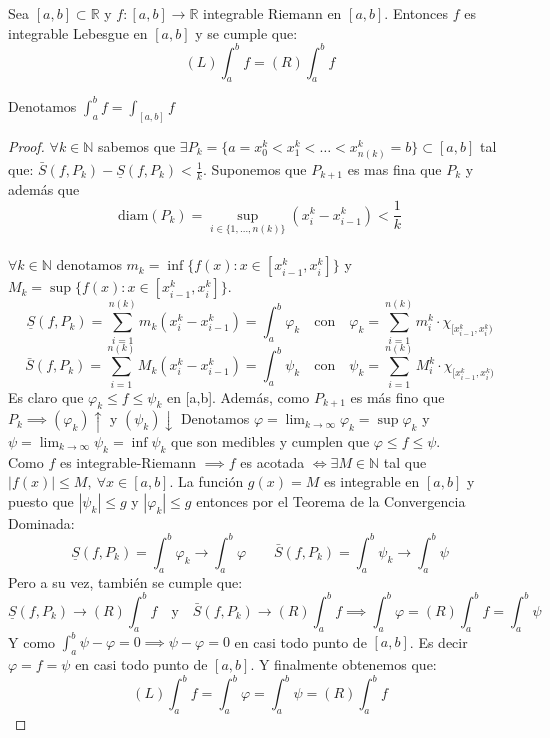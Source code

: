 \begin{teorema}
    Sea $[a, b] \subset \mathbb{R}$ y $ f:[a,b] \to \mathbb{R}$ integrable Riemann en $[a, b]$. Entonces $f$ es integrable Lebesgue en $[a, b]$ y se cumple que:
    $$ (L) \int_{a}^{b}f = (R) \int_{a}^{b}f $$
\end{teorema}
\begin{observación}
Denotamos $\int_{a}^{b}f = \int_{[a, b]}f$
\end{observación}
\begin{proof}
    $\forall k \in \mathbb{N}$ sabemos que $\exists P_k = \{ a = x_0^k < x_1^k < \dots < x_{n(k)}^k = b \} \subset [a,b]$ tal que: $\bar{S}(f, P_k) - \underline{S}(f, P_k) < \frac{1}{k}$.
    Suponemos que $P_{k+1}$ es mas fina que $P_{k}$ y además que $$\text{diam}(P_k) = \sup_{i \in \{1, \dots, n(k)\}}(x_i^k - x_{i-1}^k) < \frac{1}{k}$$
    \\$\forall k \in \mathbb{N}$ denotamos $m_k = \inf\{f(x) : x \in [x_{i-1}^k, x_i^k]\}$ y $M_k = \sup\{f(x) : x \in [x_{i-1}^k, x_i^k]\}$.
    $$ \underline{S}(f, P_k) = \sum_{i=1}^{n(k)}m_k(x_i^k - x_{i-1}^k) = \int_{a}^{b}\varphi_k \quad \text{con} \quad \varphi_k = \sum_{i = 1}^{n(k)}m_i^k\cdot\chi_{[x_{i-1}^k, x_i^k)}$$
    $$\bar{S}(f, P_k) = \sum_{i=1}^{n(k)}M_k(x_i^k - x_{i-1}^k) = \int_{a}^{b} \psi_k \quad \text{con}  \quad \psi_k  = \sum_{i = 1}^{n(k)}M_i^k\cdot\chi_{[x_{i-1}^k, x_i^k)}$$
    Es claro que $\varphi_k  \leq f \leq \psi_k$ en [a,b].
    Además, como $P_{k+1}$ es más fino que $P_k \implies (\varphi_{k})\uparrow$ y $(\psi_k)\downarrow$
    Denotamos $\varphi = \lim_{k \to \infty}\varphi_k = \sup\varphi_k$
    y $\psi  = \lim_{k \to \infty}\psi_k = \inf\psi_k$ que son medibles y cumplen que $\varphi \leq f \leq \psi$.\\
    Como $f$ es integrable-Riemann $\implies f$ es acotada $\iff \exists M \in \mathbb{N}$ tal que $|f(x)| \leq M, \ \forall x \in [a, b]$.
    La función  $ g(x) = M $ es integrable en $[a, b]$ y puesto que $|\psi_k| \leq g$ y $|\varphi_k| \leq g$ entonces por el Teorema de la Convergencia Dominada: $$\underline{S}(f, P_{k}) = \int_{a}^{b}{\varphi_k} \to \int_{a}^{b}\varphi \qquad \bar{S}(f, P_{k}) = \int_a^b\psi_k \to \int_a^b\psi$$
    Pero a su vez, también se cumple que: \\ $$\underline{S}(f, P_k) \to (R)\int_a^b f \quad \text{y} \quad \bar{S}(f, P_k) \to (R)\int_{a}^{b} f \implies \int_{a}^{b} \varphi = (R)\int_{a}^{b} f = \int_{a}^{b} \psi$$
    Y como $\int_{a}^{b} \psi - \varphi = 0 \implies \psi - \varphi = 0$ en casi todo punto de $[a, b]$. Es decir $\varphi = f = \psi$ en casi todo punto de $[a, b]$. Y finalmente obtenemos que:
    $$(L)\int_{a}^{b}f = \int_{a}^{b}\varphi = \int_a^b\psi = (R)\int_{a}^{b}f$$
\end{proof}


